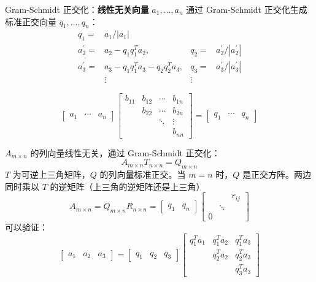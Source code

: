 \begin{remark}
    Gram-Schmidt 正交化：\textbf{线性无关向量} $a_1, \dots, a_n$ 通过 Gram-Schmidt 正交化生成标准正交向量 $q_1, \dots, q_n$：
    \begin{align*}
        q_{1}= & a_{1} /|a_{1}| & & \\
        a_{2}^{\prime}= &a_{2}-q_{1} q_{1}^{T} a_{2}, & q_{2}=&a_{2}^{\prime} /|a_{2}^{\prime}| \\
        a_{3}^{\prime}= & a_{3}-q_{1} q_{1}^{T} a_{3}-q_{2} q_{2}^{T} a_{3}, & q_{3}=&a_{3}^{\prime} /|a_{3}^{\prime}| \\
        & \vdots & \vdots &
    \end{align*}

    \[\begin{bmatrix}
        a_{1} & \cdots & a_{n}
    \end{bmatrix}\begin{bmatrix}
        b_{11} & b_{12} & \cdots & b_{1 n} \\
        & b_{22} & \cdots & b_{2 n} \\
        & & \ddots & \vdots \\
        & & & b_{n n}
    \end{bmatrix}=\begin{bmatrix}
        q_{1} & \cdots & q_{n}
    \end{bmatrix}\]

    $A_{m\times n}$ 的列向量线性无关，通过 Gram-Schmidt 正交化：
    \[A_{m\times n}T_{n\times n} = Q_{m\times n}\]
    $T$ 为可逆上三角矩阵，$Q$ 的列向量标准正交。当 $m=n$ 时，$Q$ 是正交方阵。两边同时乘以 $T$ 的逆矩阵（上三角的逆矩阵还是上三角）
    \[A_{m \times n}=Q_{m \times n} R_{n \times n}=\begin{bmatrix}
        q_{1} & q_{n}
    \end{bmatrix}\begin{bmatrix}  
        &  & r_{ij} \\  
        & \ddots &  \\  
        0  &  &   
    \end{bmatrix} \]
    可以验证：
    \[\begin{bmatrix}
        a_1 & a_2 & a_3
    \end{bmatrix} = \begin{bmatrix}
        q_1 & q_2 & q_3
    \end{bmatrix}\begin{bmatrix}
        q_{1}^{T} a_{1} & q_{1}^{T} a_{2} & q_{1}^{T} a_{3} \\
        & q_{2}^{T} a_{2} & q_{2}^{T} a_{3} \\
        & & q_{3}^{T} a_{3}
    \end{bmatrix}\]
\end{remark}

